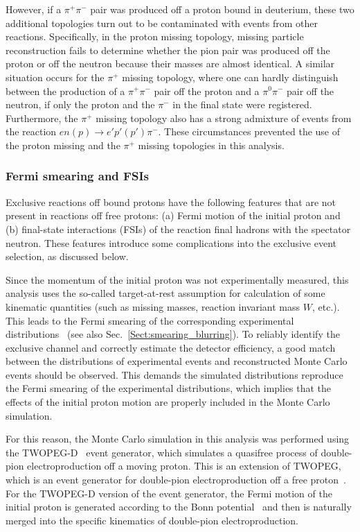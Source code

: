 \documentclass[prc,twocolumn,superscriptaddress,showpacs,amssymb,amsmath,amsfonts,aps,nofootinbib]{revtex4-1}
\begin{document}
However, if a $\pi^{+}\pi^{-}$ pair was produced off a proton bound in deuterium, these two additional topologies turn out to be contaminated with events from other reactions. Specifically, in the proton missing topology, missing particle reconstruction fails to determine whether the pion pair was produced off the proton or off the neutron because their masses are almost identical. A similar situation occurs for the $\pi^+$ missing topology, where one can hardly distinguish between the production of a $\pi^{+}\pi^{-}$ pair off the proton and a $\pi^{0}\pi^{-}$ pair off the neutron, if only the proton and the $\pi^{-}$ in the final state were registered. Furthermore, the $\pi^+$ missing topology also has a strong admixture of events from the reaction $en(p)\rightarrow e'p'(p')\pi^{-}$. These circumstances prevented the use of the proton missing and the $\pi^{+}$ missing topologies in this analysis.



\subsubsection{Fermi smearing and FSIs}


Exclusive reactions off bound protons have the following features that are not present in reactions off free protons: (a) Fermi motion of the initial proton and (b) final-state interactions (FSIs) of the reaction final hadrons with the spectator neutron. These features introduce some complications into the exclusive event selection, as discussed below.


Since the momentum of the initial proton was not experimentally measured, this analysis uses the so-called target-at-rest assumption for calculation of some kinematic quantities (such as missing masses, reaction invariant mass $W$, etc.). This leads to the Fermi smearing of the corresponding experimental distributions~\cite{Skorodumina:2015rea,note_mm_distr} (see also Sec.\!~\ref{Sect:smearing_blurring}). To reliably identify the exclusive channel and correctly estimate the detector efficiency, a good match between the distributions of experimental events and reconstructed Monte Carlo events should be observed. This demands the simulated distributions reproduce the Fermi smearing of the experimental distributions, which implies that the effects of the initial proton motion are properly included in the Monte Carlo simulation.


For this reason, the Monte Carlo simulation in this analysis was performed using the TWOPEG-D~\cite{twopeg-d} event generator, which simulates a quasifree process of double-pion electroproduction off a moving proton. This is an extension of TWOPEG, which is an event generator for double-pion electroproduction off a free proton~\cite{twopeg}. For the TWOPEG-D version of the event generator, the Fermi motion of the initial proton is generated according to the Bonn potential~\cite{Machleidt:1987hj} and then is naturally merged into the specific kinematics of double-pion electroproduction.
\end{document}
